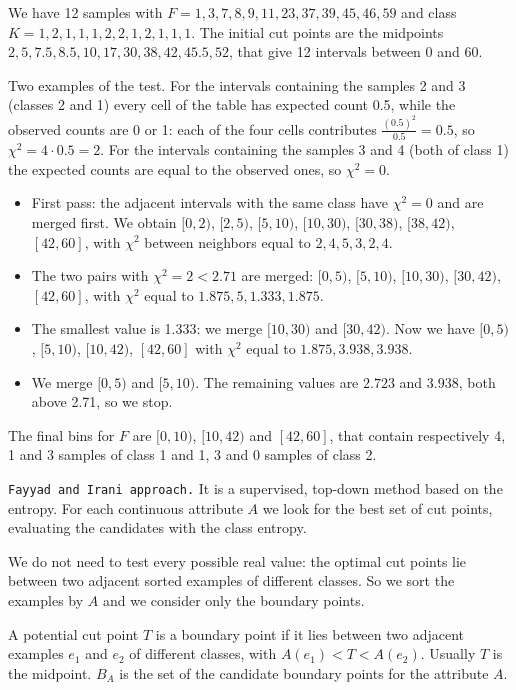\begin{example}[ChiMerge]
We have 12 samples with $F = 1, 3, 7, 8, 9, 11, 23, 37, 39, 45, 46, 59$ and class $K = 1, 2, 1, 1, 1, 2, 2, 1, 2, 1, 1, 1$. The initial cut points are the midpoints $2, 5, 7.5, 8.5, 10, 17, 30, 38, 42, 45.5, 52$, that give 12 intervals between 0 and 60.

Two examples of the test. For the intervals containing the samples 2 and 3 (classes 2 and 1) every cell of the table has expected count 0.5, while the observed counts are 0 or 1: each of the four cells contributes $\frac{(0.5)^2}{0.5}=0.5$, so $\chi^2 = 4\cdot 0.5 = 2$. For the intervals containing the samples 3 and 4 (both of class 1) the expected counts are equal to the observed ones, so $\chi^2=0$.

\begin{itemize}
    \item First pass: the adjacent intervals with the same class have $\chi^2=0$ and are merged first. We obtain $[0,2)$, $[2,5)$, $[5,10)$, $[10,30)$, $[30,38)$, $[38,42)$, $[42,60]$, with $\chi^2$ between neighbors equal to $2, 4, 5, 3, 2, 4$.
    \item The two pairs with $\chi^2=2<2.71$ are merged: $[0,5)$, $[5,10)$, $[10,30)$, $[30,42)$, $[42,60]$, with $\chi^2$ equal to $1.875, 5, 1.333, 1.875$.
    \item The smallest value is 1.333: we merge $[10,30)$ and $[30,42)$. Now we have $[0,5)$, $[5,10)$, $[10,42)$, $[42,60]$ with $\chi^2$ equal to $1.875, 3.938, 3.938$.
    \item We merge $[0,5)$ and $[5,10)$. The remaining values are $2.723$ and $3.938$, both above 2.71, so we stop.
\end{itemize}
The final bins for $F$ are $[0,10)$, $[10,42)$ and $[42,60]$, that contain respectively 4, 1 and 3 samples of class 1 and 1, 3 and 0 samples of class 2.
\end{example}

\texttt{Fayyad and Irani approach.} It is a supervised, top-down method based on the entropy. For each continuous attribute $A$ we look for the best set of cut points, evaluating the candidates with the class entropy.

We do not need to test every possible real value: the optimal cut points lie between two adjacent sorted examples of different classes. So we sort the examples by $A$ and we consider only the boundary points.

\begin{definition}
A potential cut point $T$ is a boundary point if it lies between two adjacent examples $e_1$ and $e_2$ of different classes, with $A(e_1) < T < A(e_2)$. Usually $T$ is the midpoint. $B_A$ is the set of the candidate boundary points for the attribute $A$.
\end{definition}

